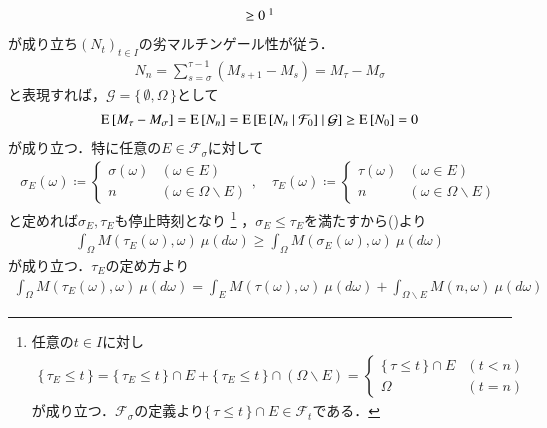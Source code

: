 \begin{prf}
\begin{description}
\begin{align}
					\geq 0\ \footnotemark
				\end{align}
				が成り立ち$(N_t)_{t \in I}$の劣マルチンゲール性が従う．
				\begin{align}
					N_n = \sum_{s=\sigma}^{\tau-1} (M_{s+1} - M_s) = M_\tau - M_\sigma
				\end{align}
				と表現すれば，$\mathcal{G} = \{\, \emptyset, \Omega\, \}$として
				\begin{align}
					\operatorname{E} \left[ M_\tau - M_\sigma \right] = \operatorname{E} \left[ N_n \right] = \operatorname{E} \left[ \operatorname{E} \left[ N_n \ \middle|\ \mathcal{F}_0 \right] \ \middle|\ \mathcal{G} \right] \geq \operatorname{E} \left[ N_0 \right] = 0
					\label{eq:thm_optional_sampling_theorem_1_1}
				\end{align}
				が成り立つ．特に任意の$E \in \mathcal{F}_\sigma$に対して
				\begin{align}
					\sigma_E(\omega) \coloneqq
					\begin{cases}
						\sigma(\omega) & (\omega \in E) \\
						n & (\omega \in \Omega \backslash E) 
					\end{cases}
					,\quad \tau_E(\omega) \coloneqq
					\begin{cases}
						\tau(\omega) & (\omega \in E) \\
						n & (\omega \in \Omega \backslash E) 
					\end{cases}
				\end{align}
				と定めれば$\sigma_E,\tau_E$も停止時刻となり
				\footnote{
					任意の$t \in I$に対し
					\begin{align}
						\{\, \tau_E \leq t\, \} 
						= \{\, \tau_E \leq t\, \} \cap E + \{\, \tau_E \leq t\, \} \cap (\Omega \backslash E)
						=\begin{cases}
							\{\, \tau \leq t\, \} \cap E & (t < n) \\
							\Omega & (t = n)
						\end{cases}
					\end{align}
					が成り立つ．$\mathcal{F}_\sigma$の定義より$\{\, \tau \leq t\, \} \cap E \in \mathcal{F}_t$である．
				}
				，$\sigma_E \leq \tau_E$を満たすから()より
				\begin{align}
					\int_\Omega M(\tau_E(\omega),\omega)\ \mu(d\omega) \geq \int_\Omega M(\sigma_E(\omega),\omega)\ \mu(d\omega)
				\end{align}
				が成り立つ．$\tau_E$の定め方より
				\begin{align}
					\int_\Omega M(\tau_E(\omega),\omega)\ \mu(d\omega) = \int_E M(\tau(\omega),\omega)\ \mu(d\omega) + \int_{\Omega \backslash E} M(n,\omega)\ \mu(d\omega)

\end{align}
\end{description}
\end{prf}
